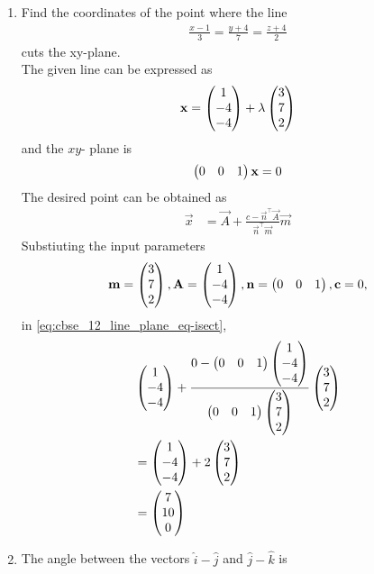 \documentclass[journal,12pt,twocolumn]{IEEEtran}
\renewcommand\thesection{\arabic{section}}
\begin{document}
\begin{enumerate}[label=\thesection.\arabic*.,ref=\thesection.\theenumi]
\item  Find the coordinates of the point where the line 
        \begin{align}
        \frac{x-1}{3} = \frac{y+4}{7} = \frac{z+4}{2}
        \nonumber
	\end{align} 
        cuts the xy-plane. \\
	\solution 
	The given line can be expressed as 
	\begin{align}
		\mathbf{x} = \begin{pmatrix}1 \\ -4 \\ -4\end{pmatrix} + \lambda \begin{pmatrix}3 \\ 7 \\ 2\end{pmatrix}
		\label{eq:cbse_12_line_plane}
\end{align}
and the $xy$- plane is 
	\begin{align}
		\begin{pmatrix}0 & 0 &1\end{pmatrix}\mathbf{x}  = 0
		\label{eq:cbse_12_line_plane_eq}
\end{align}
The desired point can be obtained as 
\begin{align}
		\label{eq:cbse_12_line_plane_eq-isect}
	\vec{x} &= \vec{A} + \frac{c - \vec{n}^{\top}\vec{A}}{\vec{n}^{\top}\vec{m}}
\vec{m}
\end{align}
Substiuting the input parameters
\begin{align}
	\mathbf{m} = \begin{pmatrix}3 \\ 7 \\ 2\end{pmatrix},
	\mathbf{A} = \begin{pmatrix}1 \\ -4 \\ -4\end{pmatrix},
	\mathbf{n} = \begin{pmatrix}0 & 0 &1\end{pmatrix},
	\mathbf{c} = 0,
\end{align}
		in \eqref{eq:cbse_12_line_plane_eq-isect},
\begin{align}
	& \begin{pmatrix}1 \\ -4 \\ -4\end{pmatrix} + \frac{0 - \begin{pmatrix}0 & 0 &1\end{pmatrix}\begin{pmatrix}1 \\ -4 \\ -4\end{pmatrix}}{\begin{pmatrix}0 & 0 &1\end{pmatrix}\begin{pmatrix}3 \\ 7 \\ 2\end{pmatrix}}\begin{pmatrix}3 \\ 7 \\ 2\end{pmatrix}
	\\
	&=\begin{pmatrix}1 \\ -4 \\ -4\end{pmatrix}+2\begin{pmatrix}3 \\ 7 \\ 2\end{pmatrix}
	\\
	&=\begin{pmatrix}7 \\ 10 \\ 0\end{pmatrix}
\end{align}
\item  The angle between the vectors $ \hat{i} - \hat{j} $ and $ \hat{j} - \hat{k} $ is


\end{enumerate}
\end{document}
